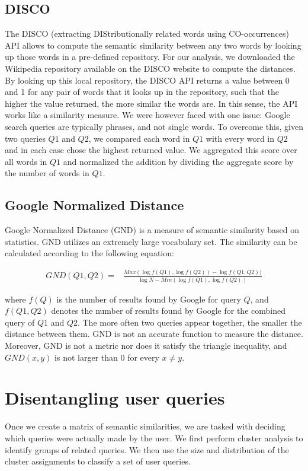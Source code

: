 \documentclass{llncs}
\begin{document}
\begin{multicols}{2}
\subsection{DISCO}
\label{sec:disco}
The DISCO (extracting DIStributionally related words using
CO-occurrences) API allows to compute the semantic similarity between
any two words by looking up those words in a pre-defined
repository. For our analysis, we downloaded the Wikipedia repository
available on the DISCO website to compute the distances. By looking up
this local repository, the DISCO API returns a value between 0 and 1
for any pair of words that it looks up in the repository, such that
the higher the value returned, the more similar the words are. In this
sense, the API works like a similarity measure. We were however faced
with one issue: Google search queries are typically phrases, and not
single words. To overcome this, given two queries $Q1$ and $Q2$, we
compared each word in $Q1$ with every word in $Q2$ and in each case
chose the highest returned value. We aggregated this score over all
words in $Q1$ and normalized the addition by dividing the aggregate
score by the number of words in $Q1$.

\subsection{Google Normalized Distance}
\label{sec:gnd}
Google Normalized Distance (GND) is a measure of semantic similarity
based on statistics. GND utilizes an extremely large vocabulary
set. The similarity can be calculated according to the following
equation:

\begin{eqnarray}
\label{eq:gnd}
GND(Q1, Q2)=%
&\frac{Max(\log f(Q1), \log f(Q2))-\log f(Q1, Q2))}{\log N - Min(\log f(Q1), \log f(Q2))}
\end{eqnarray}

where $f(Q)$ is the number of results found by Google for query $Q$,
and $f(Q1, Q2)$ denotes the number of results found by Google for the
combined query of $Q1$ and $Q2$.  The more often two queries appear
together, the smaller the distance between them. GND is not an
accurate function to measure the distance\cite{DBLP:GND}. Moreover,
GND is not a metric nor does it satisfy the triangle inequality, and
$GND(x, y)$ is not larger than 0 for every $x \neq y$.

\section{Disentangling user queries}
\label{sec:disentangle}
Once we create a matrix of semantic similarities, we are tasked
with deciding which queries were actually made by the user. We first
perform cluster analysis to identify groups of related queries. We
then use the size and distribution of the cluster assignments to classify
a set of user queries.


\end{multicols}
\end{document}
